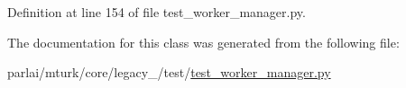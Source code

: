 Definition at line 154 of file test\+\_\+worker\+\_\+manager.\+py.



The documentation for this class was generated from the following file\+:\begin{DoxyCompactItemize}
\item 
parlai/mturk/core/legacy\+\_/test/\hyperlink{legacy__2018_2test_2test__worker__manager_8py}{test\+\_\+worker\+\_\+manager.\+py}\end{DoxyCompactItemize}
